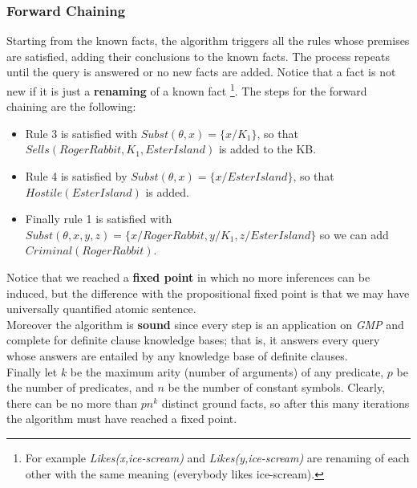 \documentclass[10pt,a4paper]{article}
\newcommand{\subst}[1]{Subst(\theta,#1)}
\begin{document}
\subsubsection{Forward Chaining}
Starting from the known facts, the algorithm triggers all the rules whose premises are satisfied, adding their conclusions to the known facts. The process repeats until the query is answered or no new facts are added. Notice that a fact is not new if it is just a \textbf{renaming} of a known fact \footnote{For example \textit{Likes(x,ice-scream)} and \textit{Likes(y,ice-scream)} are renaming of each other with the same meaning (everybody likes ice-scream).}.
The steps for the forward chaining are the following:
\begin{itemize}
\item Rule 3 is satisfied with $\subst{x}=\lbrace x/K_1 \rbrace$, so that $Sells(RogerRabbit,K_1,EsterIsland)$ is added to the KB.
\item Rule 4 is satisfied by $\subst{x}=\lbrace x/EsterIsland \rbrace$, so that $Hostile(EsterIsland)$ is added.
\item Finally rule 1 is satisfied with $\subst{x,y,z}=\lbrace x/RogerRabbit, y/K_1, z/EsterIsland \rbrace$ so we can add $Criminal(RogerRabbit)$.\\
\end{itemize}
Notice that we reached a \textbf{fixed point} in which no more inferences can be induced, but the difference with the propositional fixed point is that we may have universally quantified atomic sentence.\\
Moreover the algorithm is \textbf{sound} since every step is an application on \textit{GMP} and complete for definite clause knowledge bases; that is, it answers every query whose answers are entailed by any knowledge base of definite clauses.\\ Finally let $k$ be the maximum arity (number of arguments) of any predicate, $p$ be the number of predicates, and $n$ be the number of constant symbols. Clearly, there can be no more than $pn^k$ distinct ground facts, so after this many iterations the algorithm must have reached a fixed point.
\end{document}
